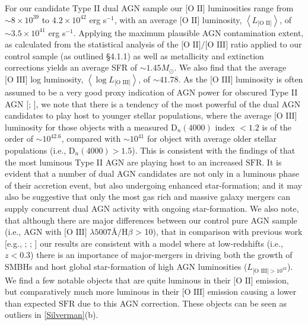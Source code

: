 For our candidate Type II dual AGN sample our $\text{[O II]}$ luminosities range from $\sim{8\times{10}^{39}}$ to $4.2\times{10}^{42}$ erg s$^{-1}$, with an average $\text{[O II]}$ luminosity, $\left\langle{L_{\text{[O II]}}}\right\rangle$, of $\sim{3.5\times{10^{41}}}$ erg s$^{-1}$. Applying the maximum plausible AGN contamination extent, as calculated from the statistical analysis of the $\text{[O II]}/\text{[O III]}$ ratio applied to our control sample (as outlined §4.1.1) as well as metallicity and extinction corrections yields an average SFR of $\sim{1.45}M_{\odot}$. We also find that the average $\text{[O III]}$ log  luminosity, $\left\langle\log{L_{\text{[O III]}}}\right\rangle$, of $\sim{41.78}$. As the $\text{[O III]}$ luminosity is often assumed to be a very good proxy indication of AGN power for obscured Type II AGN [\cite{2004ApJ...613..109H}; \cite{Wild_2010}], we note that there is a tendency of the most powerful of the dual AGN candidates to play host to younger stellar populations, where the average $\text{[O III]}$ luminosity for those objects with a measured $\text{D}_n(4000)$ index $<{1.2}$ is of the order of $\sim{10^{42.6}}$, compared with $\sim{10^{41}}$ for object with average older stellar populations (i.e., $\text{D}_n(4000)>{1.5}$). This is consistent with the findings of \cite{Kauffmann_2003} that the most luminous Type II AGN are playing host to an increased $\text{SFR}$. It is evident that a number of dual AGN candidates are not only in a luminous phase of their accretion event, but also undergoing enhanced star-formation; and it may also be suggestive that only the most gas rich and massive galaxy mergers can supply concurrent dual AGN activity with ongoing star-formation. We also note, that although there are major differences between our control pure AGN sample (i.e., AGN with $\text{[O III]}$ $\lambda{5007}$Å$/\text{H}\beta$ > 10), that in comparison with previous work [e.g., \cite{Volonteri_2003}; \cite{Gu_2006}; \cite{Somerville_2008} \cite{Rosario_2012}] our results are consistent with a model where at low-redshifts (i.e., $z<{0.3}$) there is an importance of major-mergers in driving both the growth of SMBHs and host global star-formation of high AGN luminosities ($L_{\text{[O III]}>{10^{42}}}$). We find a few notable objects that are quite luminous in their $\text{[O II]}$ emission, but comparatively much more luminous in their $\text{[O III]}$ emission causing a lower than expected $\text{SFR}$ due to this AGN correction. These objects can be seen as outliers in \ref{Silverman}(b).

